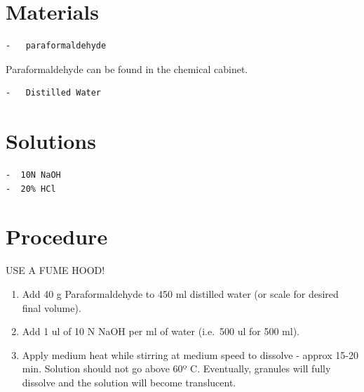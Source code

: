 \documentclass[
  letterpaper,
  DIV=11,
  numbers=noendperiod]{scrreprt}
\providecommand{\tightlist}{%
  \setlength{\itemsep}{0pt}\setlength{\parskip}{0pt}}\usepackage{longtable,booktabs,array}
\begin{document}
\hypertarget{materials-92}{%
\section{Materials}\label{materials-92}}

\begin{verbatim}
-   paraformaldehyde
\end{verbatim}

\begin{tcolorbox}[enhanced jigsaw, rightrule=.15mm, title=\textcolor{quarto-callout-note-color}{\faInfo}\hspace{0.5em}{Note}, titlerule=0mm, opacitybacktitle=0.6, toprule=.15mm, bottomrule=.15mm, opacityback=0, left=2mm, colframe=quarto-callout-note-color-frame, breakable, coltitle=black, colback=white, colbacktitle=quarto-callout-note-color!10!white, bottomtitle=1mm, leftrule=.75mm, toptitle=1mm, arc=.35mm]

Paraformaldehyde can be found in the chemical cabinet.

\end{tcolorbox}

\begin{verbatim}
-   Distilled Water
\end{verbatim}

\hypertarget{solutions-83}{%
\section{Solutions}\label{solutions-83}}

\begin{verbatim}
-  10N NaOH
-  20% HCl
\end{verbatim}

\hypertarget{procedure-91}{%
\section{Procedure}\label{procedure-91}}

USE A FUME HOOD!

\begin{enumerate}
\def\labelenumi{\arabic{enumi}.}
\tightlist
\item
  Add 40 g Paraformaldehyde to 450 ml distilled water (or scale for
  desired final volume).
\item
  Add 1 ul of 10 N NaOH per ml of water (i.e.~500 ul for 500 ml).
\item
  Apply medium heat while stirring at medium speed to dissolve - approx
  15-20 min. Solution should not go above 60º C. Eventually, granules
  will fully dissolve and the solution will become translucent.
\end{enumerate}
\end{document}
